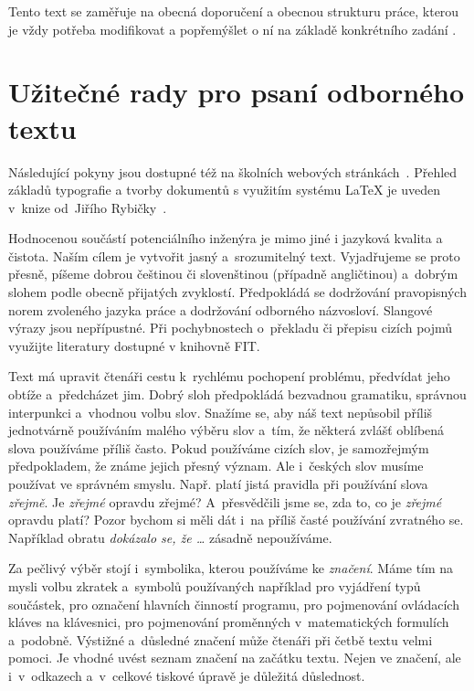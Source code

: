 Tento text se zaměřuje na obecná doporučení a obecnou strukturu práce, kterou je vždy potřeba  modifikovat a popřemýšlet o ní na základě konkrétního zadání \cite{Cernocky}.

\section{Užitečné rady pro psaní odborného textu}

Následující pokyny jsou dostupné též na školních webových stránkách~\cite{fitWeb}. Přehled základů typografie a tvorby dokumentů s využitím systému \LaTeX{} je uveden v~knize od~Jiřího Rybičky~\cite{Rybicka}.

Hodnocenou součástí potenciálního inženýra je mimo jiné i jazyková kvalita a čistota. Naším cílem je vytvořit jasný a~srozumitelný text. Vyjadřujeme se proto přesně, píšeme dobrou češtinou či slovenštinou (případně angličtinou) a~dobrým slohem podle obecně přijatých zvyklostí. Předpokládá se dodržování pravopisných norem zvoleného jazyka práce a dodržování odborného názvosloví. Slangové výrazy jsou nepřípustné. Při pochybnostech o~překladu či přepisu cizích pojmů využijte literatury dostupné v knihovně FIT.

Text má upravit čtenáři cestu k~rychlému pochopení problému, předvídat jeho obtíže a~předcházet jim. Dobrý sloh předpokládá bezvadnou gramatiku, správnou interpunkci a~vhodnou volbu slov. Snažíme se, aby náš text nepůsobil příliš jednotvárně používáním malého výběru slov a~tím, že některá zvlášť oblíbená slova používáme příliš často. Pokud používáme cizích slov, je samozřejmým předpokladem, že známe jejich přesný význam. Ale i~českých slov musíme používat ve správném smyslu. Např. platí jistá pravidla při používání slova {\it zřejmě}. Je {\it zřejmé} opravdu zřejmé? A~přesvědčili jsme se, zda to, co je {\it zřejmé} opravdu platí? Pozor bychom si měli dát i~na příliš časté používání zvratného se. Například obratu {\it dokázalo se, že \ldots{}} zásadně nepoužíváme.

Za pečlivý výběr stojí i~symbolika, kterou používáme ke {\it značení}. Máme tím na mysli volbu zkratek a~symbolů používaných například pro vyjádření typů součástek, pro označení hlavních činností programu, pro pojmenování ovládacích kláves na klávesnici, pro pojmenování proměnných v~matematických formulích a~podobně. Výstižné a~důsledné značení může čtenáři při četbě textu velmi pomoci. Je vhodné uvést seznam značení na začátku textu. Nejen ve značení, ale i~v~odkazech a~v~celkové tiskové úpravě je důležitá důslednost.

